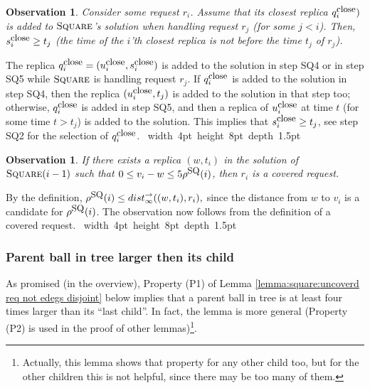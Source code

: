 \documentclass[11pt]{article}
\newtheorem{observation}[theorem]{Observation}
\def\proof{\par\noindent{\bf Proof:~}}
\def\blackslug{\hbox{\hskip 1pt \vrule width 4pt height 8pt
    depth 1.5pt \hskip 1pt}}
\def\QED{\quad\blackslug\lower 8.5pt\null\par}
\newcommand{\Square}[0]{\mbox{\sc Square}}
\newcommand{\distinf}[1]{{dist}^{\rightarrow}_{\infty}(#1)}
\newcommand{\qclose}{q^{\mbox{\small\upshape close}}}
\newcommand{\uclose}{u^{\mbox{\small\upshape close}}}
\newcommand{\sclose}{s^{\mbox{\small\upshape close}}}
\newcommand{\rhoSQ}[0]{\rho^{\mbox{\small\upshape SQ}}}
\begin{document}
\begin{observation}
Consider some request $r_i$.
Assume that its closest replica $\qclose_i)$ is added to $\Square$'s solution when handling request $r_j$ (for some $j<i$).
Then, $\sclose_i\geq t_j$ (the time of the $i$'th closest replica is not before the time $t_j$ of $r_j$).
\label{obser:sqr: closest replica is of time later than}
\end{observation}
\proof
The replica $\qclose_i=(\uclose_i,\sclose_i)$ is added to the solution in step SQ4 or in step SQ5 while $\Square$ is handling request $r_j$.
If $\qclose_i$ is added to the solution in step SQ4, then the replica $(\uclose_i,t_j)$ is added to the solution in that step too;
otherwise, $\qclose_i$ is added in step SQ5, and then a replica of $\uclose_i$ at time $t$ (for some time $t>t_j$) is added to the solution.
This implies that $\sclose_i\geq t_j$, see step SQ2 for the selection of $\qclose_i$.
\QED



\begin{observation}
If there exists a replica $(w,t_i)$ in the solution of $\Square(i-1)$ such that $0\leq v_i-w\leq 5\rhoSQ(i)$,
then $r_i$ is a covered request.
\label{obser:sqr: if soff=ti then ri is covered}
\end{observation}
\proof
By the definition,
$
\rhoSQ(i)\leq\distinf{(w,t_i),r_i},
$
since the distance from $w$ to $v_i$ is a candidate for $\rhoSQ(i)$.
The observation now follows from the definition of a covered request.
\QED



\subsubsection{Parent ball in tree larger then its child}

As promised (in the overview), Property (P1) of Lemma \ref{lemma:square:uncoverd req not edegs disjoint}
below implies that a parent ball in tree is at least four times larger than its ``last child''.
In fact, the lemma is more general (Property (P2) is used in the proof of other lemmas)\footnote{
Actually, this lemma shows that property for any other child too,
but for the other children this is not helpful, since there may be too many of them.
}.
\end{document}
